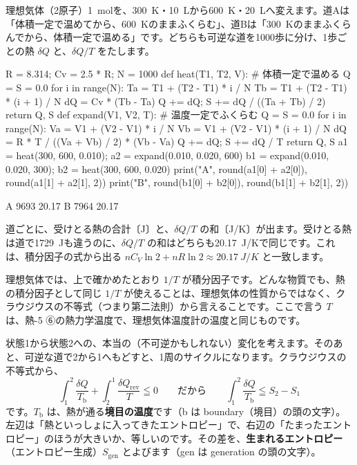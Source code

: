 理想気体（2原子）\qty{1}{mol}を、\qty{300}{K}・\qty{10}{L}から\qty{600}{K}・\qty{20}{L}へ変えます。道Aは「体積一定で温めてから、\qty{600}{K}のままふくらむ」、道Bは「\qty{300}{K}のままふくらんでから、体積一定で温める」です。どちらも可逆な道を1000歩に分け、1歩ごとの熱 $\delta Q$ と、$\delta Q/T$ をたします。
\begin{phcode}
R = 8.314; Cv = 2.5 * R; N = 1000
def heat(T1, T2, V):        \# 体積一定で温める
    Q = S = 0.0
    for i in range(N):
        Ta = T1 + (T2 - T1) * i / N
        Tb = T1 + (T2 - T1) * (i + 1) / N
        dQ = Cv * (Tb - Ta)
        Q += dQ; S += dQ / ((Ta + Tb) / 2)
    return Q, S
def expand(V1, V2, T):      \# 温度一定でふくらむ
    Q = S = 0.0
    for i in range(N):
        Va = V1 + (V2 - V1) * i / N
        Vb = V1 + (V2 - V1) * (i + 1) / N
        dQ = R * T / ((Va + Vb) / 2) * (Vb - Va)
        Q += dQ; S += dQ / T
    return Q, S
a1 = heat(300, 600, 0.010); a2 = expand(0.010, 0.020, 600)
b1 = expand(0.010, 0.020, 300); b2 = heat(300, 600, 0.020)
print("A", round(a1[0] + a2[0]), round(a1[1] + a2[1], 2))
print("B", round(b1[0] + b2[0]), round(b1[1] + b2[1], 2))
\end{phcode}
\begin{phcodeout}
A 9693 20.17
B 7964 20.17
\end{phcodeout}
道ごとに、受けとる熱の合計〔J〕と、$\delta Q/T$ の和〔J/K〕が出ます。受けとる熱は道で\qty{1729}{J}も違うのに、$\delta Q/T$ の和はどちらも\qty{20.17}{J/K}で同じです。これは、積分因子の式から出る $nC_V\ln2+nR\ln2\approx\qty{20.17}{J/K}$ と一致します。

\begin{seikaku}
理想気体では、上で確かめたとおり $1/T$ が積分因子です。どんな物質でも、熱の積分因子として同じ $1/T$ が使えることは、理想気体の性質からではなく、クラウジウスの不等式（つまり第二法則）から言えることです。ここで言う $T$ は、熱-5 ⑥の熱力学温度で、理想気体温度計の温度と同じものです。
\end{seikaku}

状態1から状態2への、本当の（不可逆かもしれない）変化を考えます。そのあと、可逆な道で2から1へもどすと、1周のサイクルになります。クラウジウスの不等式から、
\[\int_1^2\frac{\delta Q}{T_{\mathrm b}}+\int_2^1\frac{\delta Q_{\mathrm{rev}}}{T}\leqq0\qquad\text{だから}\qquad\int_1^2\frac{\delta Q}{T_{\mathrm b}}\leqq S_2-S_1\]
です。$T_{\mathrm b}$ は、熱が通る\textbf{境目の温度}です（b は boundary（境目）の頭の文字）。左辺は「熱といっしょに入ってきたエントロピー」で、右辺の「たまったエントロピー」のほうが大きいか、等しいのです。その差を、\textbf{生まれるエントロピー}（エントロピー生成）$S_{\mathrm{gen}}$ とよびます（gen は generation の頭の文字）。

